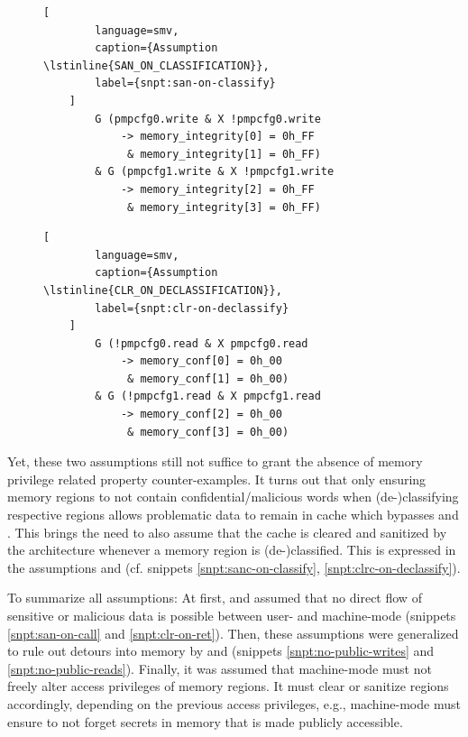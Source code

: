 \begin{figure}
    \begin{lstlisting}[
        language=smv,
        caption={Assumption \lstinline{SAN_ON_CLASSIFICATION}},
        label={snpt:san-on-classify}
    ]
        G (pmpcfg0.write & X !pmpcfg0.write
            -> memory_integrity[0] = 0h_FF
             & memory_integrity[1] = 0h_FF)
        & G (pmpcfg1.write & X !pmpcfg1.write
            -> memory_integrity[2] = 0h_FF
             & memory_integrity[3] = 0h_FF)
    \end{lstlisting}

    \begin{lstlisting}[
        language=smv,
        caption={Assumption \lstinline{CLR_ON_DECLASSIFICATION}},
        label={snpt:clr-on-declassify}
    ]
        G (!pmpcfg0.read & X pmpcfg0.read
            -> memory_conf[0] = 0h_00
             & memory_conf[1] = 0h_00)
        & G (!pmpcfg1.read & X pmpcfg1.read
            -> memory_conf[2] = 0h_00
             & memory_conf[3] = 0h_00)
    \end{lstlisting}
\end{figure}

Yet, these two assumptions still not suffice to grant the absence of memory privilege related property counter-examples.
It turns out that only ensuring memory regions to not contain confidential/malicious words when (de-)classifying respective regions allows problematic data to remain in cache which bypasses  and .
This brings the need to also assume that the cache is cleared and sanitized by the architecture whenever a memory region is (de-)classified.
This is expressed in the assumptions  and  (cf. snippets \ref{snpt:sanc-on-classify}, \ref{snpt:clrc-on-declassify}).

To summarize all assumptions:
At first,  and  assumed that no direct flow of sensitive or malicious data is possible between user- and machine-mode (snippets \ref{snpt:san-on-call} and \ref{snpt:clr-on-ret}).
Then, these assumptions were generalized to rule out detours into memory by  and  (snippets \ref{snpt:no-public-writes} and \ref{snpt:no-public-reads}).
Finally, it was assumed that machine-mode must not freely alter access privileges of memory regions.
It must clear or sanitize regions accordingly, depending on the previous access privileges, e.g., machine-mode must ensure to not forget secrets in memory that is made publicly accessible.

